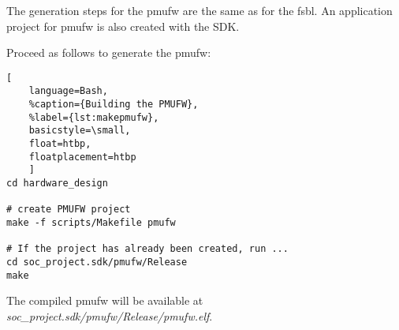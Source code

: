 The generation steps for the \gls{pmufw} are the same as for the \gls{fsbl}. An application project for \gls{pmufw} is also created with the SDK.

Proceed as follows to generate the \gls{pmufw}:
\begin{lstlisting}[
	language=Bash,
	%caption={Building the PMUFW},
	%label={lst:makepmufw},
	basicstyle=\small,
	float=htbp,
	floatplacement=htbp
	]
cd hardware_design

# create PMUFW project
make -f scripts/Makefile pmufw

# If the project has already been created, run ...
cd soc_project.sdk/pmufw/Release
make
\end{lstlisting}
\FloatBarrier

The compiled \gls{pmufw} will be available at \emph{soc_project.sdk/pmufw/Release/pmufw.elf}.